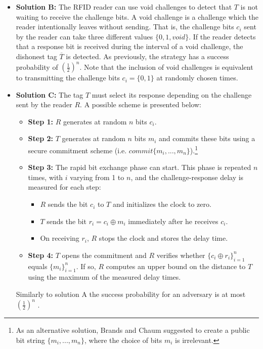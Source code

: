 \documentclass{article}
\begin{document}
\begin{itemize}
\item \textbf{Solution B:} The RFID reader can use void challenges \cite{munilla2} to detect that $T$ is not waiting to receive the challenge bits. A void challenge is a challenge which the reader intentionally leaves without sending. That is, the challenge bits  $c_i$ sent by the reader can take three different values $\{0, 1, void  \}$. If the reader detects that a response bit is received during the interval of a void challenge, the dishonest tag $\overline{T}$ is detected.  As previously, the strategy has a success probability of $(\frac{1}{2})^n$. Note that the inclusion of void challenges is equivalent to transmitting the challenge bits $c_i=\{0, 1\}$ at randomly chosen times.
\item \textbf{Solution C:} The tag $T$ must select its response depending on the challenge sent by the reader $R$.  A possible scheme is presented below:
    \begin{itemize}
      \item \textbf{Step 1:} $R$ generates at random $n$ bits $c_i$.
      \item \textbf{Step 2:} $T$ generates at random $n$ bits $m_i$ and commits these bits using a secure commitment scheme (i.e. $commit\{m_i,...,m_n\}$).\footnote{As an alternative solution, Brands and Chaum \cite{brands94} suggested to create a public bit string $\{m_i,...,m_n\}$, where the choice of bits $m_i$ is irrelevant.}
       \item \textbf{Step 3:} The rapid bit exchange phase can start. This phase is repeated $n$ times, with $i$ varying from 1 to $n$, and the challenge-response delay is measured for each step:
           \begin{itemize}
             \item $R$ sends the bit $c_i$ to $T$ and initializes the clock to zero.
             \item $T$ sends the bit $r_i = c_i \oplus m_i$ immediately after he receives $c_i$.
             \item On receiving $r_i$, $R$ stops the clock and stores the delay time.
           \end{itemize}
      \item \textbf{Step 4:} $T$ opens the commitment and $R$ verifies whether $\{ {c_i \oplus r_i}\} _{i=1}^{n}$ equals $\{{m_i}\}_{i=1}^n$. If so, $R$ computes an upper bound on the distance to $T$ using the maximum of the measured delay times.
    \end{itemize}

     Similarly to solution A the success probability for an adversary is at most $(\frac{1}{2})^n$ \cite{brands94}.
\end{itemize}
\end{document}
